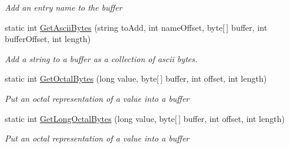 \begin{DoxyCompactItemize}
\begin{DoxyCompactList}\small\item\em Add an entry name to the buffer \end{DoxyCompactList}\item 
static int \hyperlink{class_i_c_sharp_code_1_1_sharp_zip_lib_1_1_tar_1_1_tar_header_a3bb0d550a8235be5ddd39867ba986d9b}{Get\+Ascii\+Bytes} (string to\+Add, int name\+Offset, byte\mbox{[}$\,$\mbox{]} buffer, int buffer\+Offset, int length)
\begin{DoxyCompactList}\small\item\em Add a string to a buffer as a collection of ascii bytes. \end{DoxyCompactList}\item 
static int \hyperlink{class_i_c_sharp_code_1_1_sharp_zip_lib_1_1_tar_1_1_tar_header_a7dcb54e1146660d66b47bca8fe6478e1}{Get\+Octal\+Bytes} (long value, byte\mbox{[}$\,$\mbox{]} buffer, int offset, int length)
\begin{DoxyCompactList}\small\item\em Put an octal representation of a value into a buffer \end{DoxyCompactList}\item 
static int \hyperlink{class_i_c_sharp_code_1_1_sharp_zip_lib_1_1_tar_1_1_tar_header_a88b28e1f7f6265b1142a9b1dd8684752}{Get\+Long\+Octal\+Bytes} (long value, byte\mbox{[}$\,$\mbox{]} buffer, int offset, int length)
\begin{DoxyCompactList}\small\item\em Put an octal representation of a value into a buffer \end{DoxyCompactList}\end{DoxyCompactItemize}
